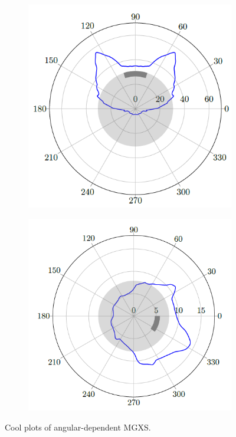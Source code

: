 \begin{figure}[H]
\begin{subfigure}{.5\textwidth}
  \centering
  \includegraphics[width=\linewidth]{figures/sph/batman-1}
  \caption{}
\end{subfigure}
\begin{subfigure}{.5\textwidth}
  \centering
  \includegraphics[width=\linewidth]{figures/sph/batman-2}
  \caption{}
\end{subfigure}
\caption[Batman plots]{Cool plots of angular-dependent \ac{MGXS}.}
\label{fig:chap4-rel-err-energy}
\end{figure}

